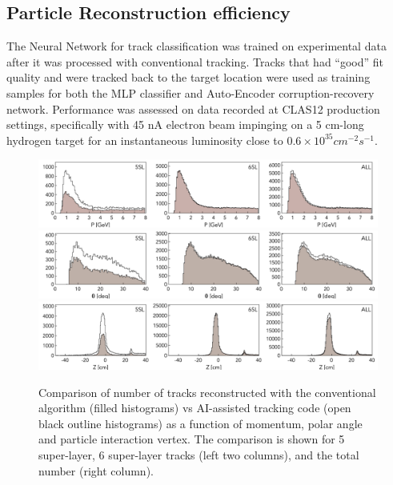 \documentclass[aps,prl,preprint,12pt]{revtex4}
\begin{document}
 \subsection{Particle Reconstruction efficiency}
 
 The Neural Network for track classification was trained on experimental 
 data after it was processed with conventional tracking. Tracks that had ``good'' 
 fit quality and were tracked back to the target location were used as training 
 samples for both the MLP classifier and Auto-Encoder corruption-recovery network. 
 Performance was assessed on data recorded at CLAS12 production settings, 
 specifically with 45 nA electron beam impinging on a 5 cm-long hydrogen target 
 for an instantaneous luminosity close to $0.6\times10^{35} cm^{-2} s^{-1}$.

 \begin{figure}[!ht]
\begin{center}
  \includegraphics[width=6.5in]{images/figure_p.pdf}
  \includegraphics[width=6.5in]{images/figure_theta.pdf}
    \includegraphics[width=6.5in]{images/figure_vz.pdf}
\caption { Comparison of number of tracks reconstructed with the conventional 
algorithm (filled histograms) vs AI-assisted tracking code (open black outline 
histograms) as a function of momentum, polar angle and particle interaction vertex. 
The comparison is shown for 5 super-layer, 6 super-layer tracks (left two columns), 
and the total number (right column).}
 \label{track:efficiency}
 \end{center}
\end{figure}
\end{document}
